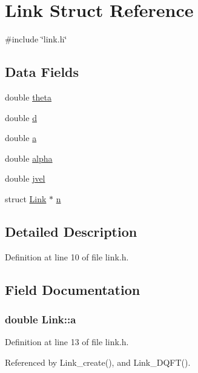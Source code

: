 \hypertarget{structLink}{\section{Link Struct Reference}
\label{structLink}
}


{\ttfamily \#include \char`\"{}link.\-h\char`\"{}}

\subsection*{Data Fields}
\begin{DoxyCompactItemize}
\item 
double \hyperlink{structLink_a88e705bc7fb6c7c8c7fa6987b52667d6}{theta}
\item 
double \hyperlink{structLink_a4e5e4ea2ef9be2aae1e9fdef406be185}{d}
\item 
double \hyperlink{structLink_a3ef89c4478d7e2de8a59de9c88052123}{a}
\item 
double \hyperlink{structLink_ab838e5bc121c212cb1a81fdf78de8757}{alpha}
\item 
double \hyperlink{structLink_a9ba28f0b8b867ad4624abb9730ef30d2}{jvel}
\item 
struct \hyperlink{structLink}{Link} $\ast$ \hyperlink{structLink_a185503cf680f8e9395c19c0521997c5c}{n}
\end{DoxyCompactItemize}


\subsection{Detailed Description}


Definition at line 10 of file link.\-h.



\subsection{Field Documentation}
\hypertarget{structLink_a3ef89c4478d7e2de8a59de9c88052123}{
\subsubsection[{a}]{\setlength{\rightskip}{0pt plus 5cm}double Link\-::a}}\label{structLink_a3ef89c4478d7e2de8a59de9c88052123}


Definition at line 13 of file link.\-h.



Referenced by Link\-\_\-create(), and Link\-\_\-\-D\-Q\-F\-T().

